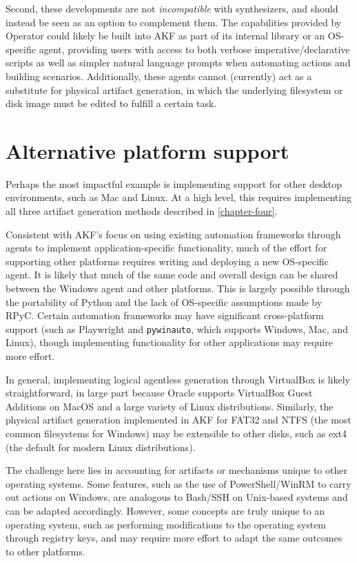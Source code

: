 Second, these developments are not \emph{incompatible} with
synthesizers, and should instead be seen as an option to complement
them. The capabilities provided by Operator could likely be built into
AKF as part of its internal library or an OS-specific agent, providing
users with access to both verbose imperative/declarative scripts as well
as simpler natural language prompts when automating actions and building
scenarios. Additionally, these agents cannot (currently) act as a
substitute for physical artifact generation, in which the underlying
filesystem or disk image must be edited to fulfill a certain task.

\section{Alternative platform
support}\label{alternative-platform-support}

Perhaps the most impactful example is implementing support for other
desktop environments, such as Mac and Linux. At a high level, this
requires implementing all three artifact generation methods described in
\autoref{chapter-four}.

Consistent with AKF's focus on using existing automation frameworks
through agents to implement application-specific functionality, much of
the effort for supporting other platforms requires writing and deploying
a new OS-specific agent. It is likely that much of the same code and
overall design can be shared between the Windows agent and other
platforms. This is largely possible through the portability of Python
and the lack of OS-specific assumptions made by RPyC. Certain automation
frameworks may have significant cross-platform support (such as
Playwright and \passthrough{\lstinline!pywinauto!}, which supports
Windows, Mac, and Linux), though implementing functionality for other
applications may require more effort.

In general, implementing logical agentless generation through VirtualBox
is likely straightforward, in large part because Oracle supports
VirtualBox Guest Additions on MacOS and a large variety of Linux
distributions. Similarly, the physical artifact generation implemented
in AKF for FAT32 and NTFS (the most common filesystems for Windows) may
be extensible to other disks, such as ext4 (the default for modern Linux
distributions).

The challenge here lies in accounting for artifacts or mechanisms unique
to other operating systems. Some features, such as the use of
PowerShell/WinRM to carry out actions on Windows, are analogous to
Bash/SSH on Unix-based systems and can be adapted accordingly. However,
some concepts are truly unique to an operating system, such as
performing modifications to the operating system through registry keys,
and may require more effort to adapt the same outcomes to other
platforms.

